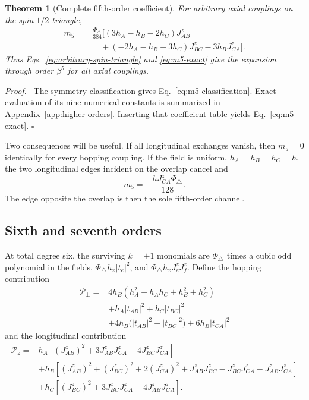 \documentclass[aps,prb,preprint,nofootinbib,longbibliography]{revtex4-2}
\newcommand{\PhiTri}{\Phi_\triangle}
\newtheorem{theorem}{Theorem}
\newenvironment{proof}{\par\noindent\textit{Proof.}\ }%
{\unskip\nobreak\hfill\(\square\)\par}
\begin{document}
\begin{theorem}[Complete fifth-order coefficient]
\label{thm:quintic}
For arbitrary axial couplings on the spin-$1/2$ triangle,
\begin{align}
 m_5={}&\frac{\PhiTri}{384}\bigl[
 (3h_A-h_B-2h_C)J_{AB}^z\nonumber\\
 &\quad+(-2h_A-h_B+3h_C)J_{BC}^z
 -3h_BJ_{CA}^z\bigr].
 \label{eq:m5-exact}
\end{align}
Thus Eqs.~\eqref{eq:arbitrary-spin-triangle} and \eqref{eq:m5-exact} give the expansion
through order $\beta^5$ for all axial couplings.
\end{theorem}

\begin{proof}
The symmetry classification gives Eq.~\eqref{eq:m5-classification}.  Exact
evaluation of its nine numerical constants is summarized in
Appendix~\ref{app:higher-orders}.  Inserting that coefficient table yields
Eq.~\eqref{eq:m5-exact}.
\end{proof}

Two consequences will be useful.  If all longitudinal exchanges vanish,
then $m_5=0$ identically for every hopping coupling.  If the field is
uniform, $h_A=h_B=h_C=h$, the two longitudinal edges incident on the overlap
cancel and
\begin{equation}
 m_5=-\frac{hJ_{CA}^z\PhiTri}{128}.
 \label{eq:m5-uniform}
\end{equation}
The edge opposite the overlap is then the sole fifth-order channel.

\subsection{Sixth and seventh orders}

At total degree six, the surviving $k=\pm1$ monomials are $\PhiTri$ times a
cubic odd polynomial in the fields, $\PhiTri h_x|t_e|^2$, and
$\PhiTri h_xJ_e^zJ_f^z$.  Define the hopping contribution
\begin{align}
 \mathcal P_\perp={}&
 4h_B(h_A^2+h_Ah_C+h_B^2+h_C^2)\nonumber\\
 &+h_A|t_{AB}|^2+h_C|t_{BC}|^2\nonumber\\
 &+4h_B\bigl(|t_{AB}|^2+|t_{BC}|^2\bigr)
 +6h_B|t_{CA}|^2
 \label{eq:Pperp}
\end{align}
and the longitudinal contribution
\begin{align}
 \mathcal P_z={}&
 h_A\left[(J_{AB}^z)^2+3J_{AB}^zJ_{CA}^z
              -4J_{BC}^zJ_{CA}^z\right]\nonumber\\
 &+h_B\left[(J_{AB}^z)^2+(J_{BC}^z)^2+2(J_{CA}^z)^2
       +J_{AB}^zJ_{BC}^z-J_{BC}^zJ_{CA}^z-J_{AB}^zJ_{CA}^z\right]\nonumber\\
 &+h_C\left[(J_{BC}^z)^2+3J_{BC}^zJ_{CA}^z
              -4J_{AB}^zJ_{CA}^z\right].
 \label{eq:Pz}
\end{align}
\end{document}
